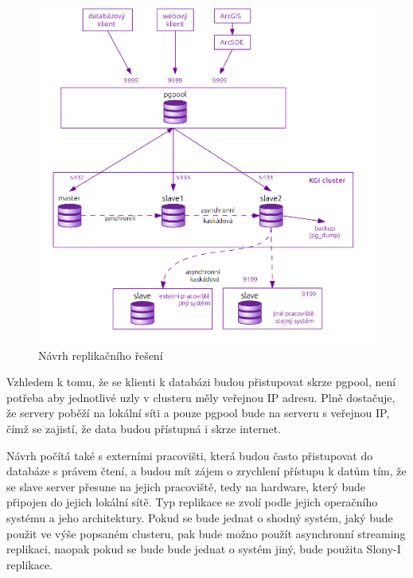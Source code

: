       \begin{figure}[H]
        \label{oNavrhKatedra}
        \centering
        \includegraphics[scale=1]{../../../grafy/obr/schema_navrhKatedra2.png}
        \caption {Návrh replikačního řešení}
      \end{figure}

Vzhledem k tomu, že se klienti k databázi budou přistupovat skrze pgpool, není potřeba aby jednotlivé uzly v clusteru měly veřejnou IP adresu. Plně dostačuje, že servery poběží na lokální síti a pouze pgpool bude na serveru s veřejnou IP, čímž se zajistí, že data budou přístupná i skrze internet. 

Návrh počítá také s externími pracovišti, která budou často přistupovat do databáze s právem čtení, a budou mít zájem o zrychlení přístupu k datům tím, že se slave server přesune na jejich pracoviště, tedy na hardware, který bude připojen do jejich lokální sítě. Typ replikace se zvolí podle jejich operačního systému a jeho architektury. Pokud se bude jednat o shodný systém, jaký bude použit ve výše popsaném clusteru, pak bude možno použít asynchronní streaming replikaci, naopak pokud se bude bude jednat o systém jiný, bude použita Slony-I replikace. 

